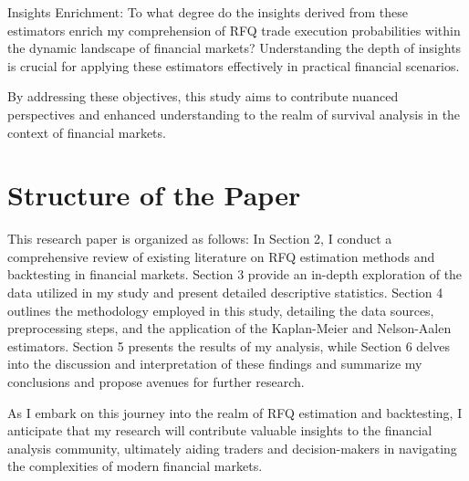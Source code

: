 Insights Enrichment: To what degree do the insights derived from these estimators enrich my comprehension of RFQ trade execution probabilities within the dynamic landscape of financial markets? Understanding the depth of insights is crucial for applying these estimators effectively in practical financial scenarios.

By addressing these objectives, this study aims to contribute nuanced perspectives and enhanced understanding to the realm of survival analysis in the context of financial markets.

\section{Structure of the Paper}
This research paper is organized as follows: In Section 2, I conduct a comprehensive review of existing literature on RFQ estimation methods and backtesting in financial markets. Section 3 provide an in-depth exploration of the data utilized in my study and present detailed descriptive statistics. Section 4 outlines the methodology employed in this study, detailing the data sources, preprocessing steps, and the application of the Kaplan-Meier and Nelson-Aalen estimators. Section 5 presents the results of my analysis, while Section 6 delves into the discussion and interpretation of these findings and summarize my conclusions and propose avenues for further research.

As I embark on this journey into the realm of RFQ estimation and backtesting, I anticipate that my research will contribute valuable insights to the financial analysis community, ultimately aiding traders and decision-makers in navigating the complexities of modern financial markets.
